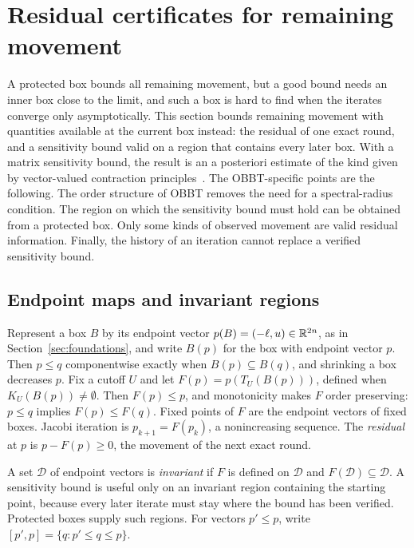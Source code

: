 \section{Residual certificates for remaining movement}\label{sec:residual}

A protected box bounds all remaining movement, but a good bound needs an
inner box close to the limit, and such a box is hard to find when the
iterates converge only asymptotically. This section bounds remaining
movement with quantities available at the current box instead: the
residual of one exact round, and a sensitivity bound valid on a region
that contains every later box. With a matrix sensitivity bound, the
result is an a posteriori estimate of the kind given by vector-valued
contraction principles~\cite{jachymski2016perov}. The OBBT-specific
points are the following. The order structure of OBBT removes the need
for a spectral-radius condition. The region on which the sensitivity
bound must hold can be obtained from a protected box. Only some kinds of
observed movement are valid residual information. Finally, the history of
an iteration cannot replace a verified sensitivity bound.

\subsection{Endpoint maps and invariant regions}\label{sec:residual-maps}

Represent a box $B$ by its endpoint vector $p(B)=(-\ell,u)\in\mathbb{R}^{2n}$, as
in Section~\ref{sec:foundations}, and write $B(p)$ for the box with
endpoint vector $p$. Then $p\le q$ componentwise exactly when
$B(p)\subseteq B(q)$, and shrinking a box decreases $p$. Fix a cutoff $U$
and let $F(p)=p(T_U(B(p)))$, defined when $K_U(B(p))\ne\emptyset$. Then
$F(p)\le p$, and monotonicity makes $F$ order preserving: $p\le q$
implies $F(p)\le F(q)$. Fixed points of $F$ are the endpoint vectors of
fixed boxes. Jacobi iteration is $p_{k+1}=F(p_k)$, a nonincreasing
sequence. The \emph{residual} at $p$ is $p-F(p)\ge0$, the movement of
the next exact round.

A set $\mathcal D$ of endpoint vectors is \emph{invariant} if $F$ is
defined on $\mathcal D$ and $F(\mathcal D)\subseteq\mathcal D$. A
sensitivity bound is useful only on an invariant region containing the
starting point, because every later iterate must stay where the bound has
been verified. Protected boxes supply such regions. For vectors
$p'\le p$, write $[p',p]=\{q:p'\le q\le p\}$.

